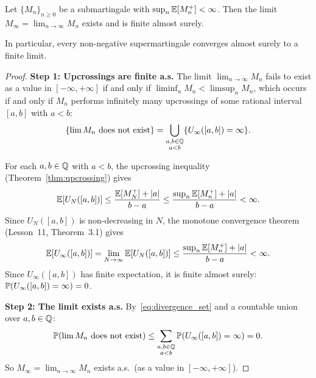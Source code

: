\documentclass[11pt,a4paper]{article}
\begin{document}
\begin{keyresult}[title={Doob's Forward Convergence Theorem}]
\begin{theorem}
\label{thm:doob_convergence}
Let $\{M_n\}_{n \geq 0}$ be a submartingale with
$\sup_n \mathbb{E}[M_n^+] < \infty$.  Then the limit
$M_\infty = \lim_{n \to \infty} M_n$ exists and is finite almost
surely.

In particular, every non-negative supermartingale converges
almost surely to a finite limit.
\end{theorem}
\end{keyresult}

\begin{proof}
\textbf{Step 1: Upcrossings are finite a.s.}
The limit $\lim_{n \to \infty} M_n$ fails to exist as a value in
$[-\infty, +\infty]$ if and only if
$\liminf_n M_n < \limsup_n M_n$, which occurs if and only if
$M_n$ performs infinitely many upcrossings of some rational
interval $[a, b]$ with $a < b$:
\begin{equation}
  \{\lim M_n \text{ does not exist}\}
  = \bigcup_{\substack{a, b \in \mathbb{Q} \\ a < b}}
    \{U_\infty([a,b]) = \infty\}.
  \label{eq:divergence_set}
\end{equation}

For each $a, b \in \mathbb{Q}$ with $a < b$, the upcrossing
inequality (Theorem~\ref{thm:upcrossing}) gives
\begin{equation}
  \mathbb{E}[U_N([a,b])]
  \leq \frac{\mathbb{E}[M_N^+] + |a|}{b - a}
  \leq \frac{\sup_n \mathbb{E}[M_n^+] + |a|}{b - a} < \infty.
  \label{eq:upcrossing_bound}
\end{equation}
Since $U_N([a,b])$ is non-decreasing in $N$, the monotone
convergence theorem (Lesson~11, Theorem~3.1) gives
\begin{equation}
  \mathbb{E}[U_\infty([a,b])]
  = \lim_{N \to \infty} \mathbb{E}[U_N([a,b])]
  \leq \frac{\sup_n \mathbb{E}[M_n^+] + |a|}{b - a} < \infty.
\end{equation}
Since $U_\infty([a,b])$ has finite expectation, it is finite
almost surely: $\mathbb{P}(U_\infty([a,b]) = \infty) = 0$.

\textbf{Step 2: The limit exists a.s.}
By~\eqref{eq:divergence_set} and a countable union over
$a, b \in \mathbb{Q}$:
\begin{equation}
  \mathbb{P}(\lim M_n \text{ does not exist})
  \leq \sum_{\substack{a,b \in \mathbb{Q} \\ a < b}}
    \mathbb{P}(U_\infty([a,b]) = \infty) = 0.
\end{equation}
So $M_\infty = \lim_{n \to \infty} M_n$ exists a.s.\ (as a value
in $[-\infty, +\infty]$).


\end{proof}
\end{document}
